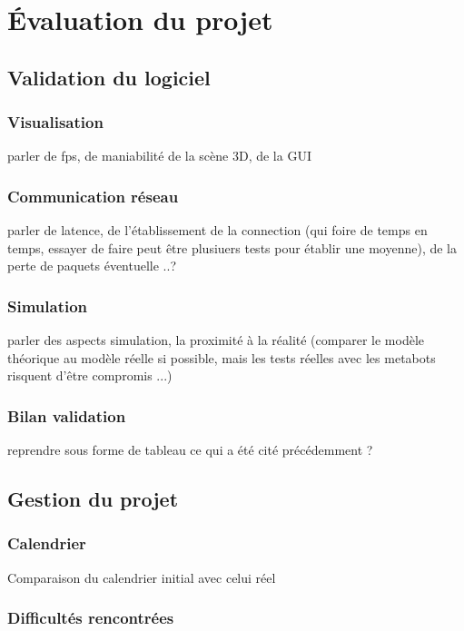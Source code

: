 \section{Évaluation du projet}
\subsection{Validation du logiciel} %
\subsubsection{Visualisation}
parler de fps, de maniabilité de la scène 3D, de la GUI

\subsubsection{Communication réseau}
parler de latence, de l'établissement de la connection (qui foire de temps en temps, essayer de faire peut être plusiuers tests pour établir une moyenne), de la perte de paquets éventuelle ..?

\subsubsection{Simulation}
parler des aspects simulation, la proximité à la réalité (comparer le modèle théorique au modèle réelle si possible, mais les tests réelles avec les metabots risquent d'être compromis ...)

\subsubsection{Bilan validation}
reprendre sous forme de tableau ce qui a été cité précédemment ?

\subsection{Gestion du projet}
\subsubsection{Calendrier}
Comparaison du calendrier initial avec celui réel

\subsubsection{Difficultés rencontrées}
